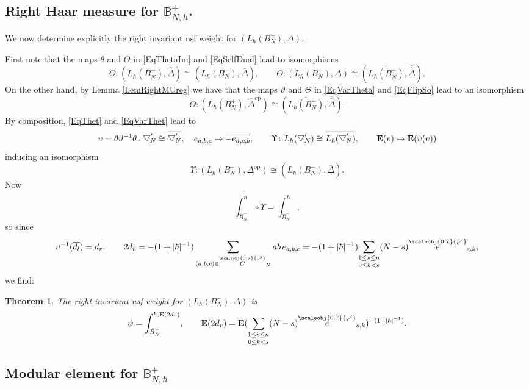 \documentclass[11pt, reqno]{amsart}
\newtheorem{theorem}{Theorem}[section]
\theoremstyle{definition}
\numberwithin{equation}{section}
\newcommand{\eb}{\mathbf{E}}
\newcommand{\Bor}{B}
\newcommand{\nears}{\scaleobj{0.7}{\nearrow}}
\newcommand{\swars}{\scaleobj{0.7}{\swarrow}}
\newcommand{\swe}{\overset{\swars}{e}}
\newcommand{\neC}{\overset{\nears}{C}}
\newcommand{\Eb}{\mathbf{E}}
\newcommand{\wbtd}[1]{\raisebox{\depth}{$\bigtriangledown'$\!\!}_{#1}}
\newcommand{\opp}{\mathrm{op}}
\newcommand{\Bbbb}{\mathbb{B}}
\begin{document}
\subsection{Right Haar measure for  \texorpdfstring{$\Bbbb_{N,\hbar}^+$}{the upper Borel quantum group}.}

We now determine explicitly the right invariant nsf weight for $(L_{\hbar}(\Bor_N^-),\Delta)$. 

First note that the maps 
$\theta$ and $\Theta$ in \eqref{EqThetaIm} and \eqref{EqSelfDual} lead to  isomorphisms 
\begin{equation}\label{EqThet}
\Theta\colon (L_{\hbar}(\Bor_N^+),\hat{\Delta}) \cong (\overline{L_{\hbar}(\Bor_N^-)},\overline{\Delta}),\qquad \Theta\colon  (L_{\hbar}(\Bor_N^-),\Delta)\cong (\overline{L_{\hbar}(\Bor_N^+)},\overline{\hat{\Delta}}).
\end{equation}
On the other hand, by Lemma \ref{LemRightMUreg} we have that the maps $\vartheta$ and $\varTheta$ in \eqref{EqVarTheta} and \eqref{EqFlipSo} lead to an isomorphism 
\begin{equation}\label{EqVarThet}
\varTheta\colon (L_{\hbar}(\Bor_N^+),\hat{\Delta}^{\opp}) \cong (\overline{L_{\hbar}(\Bor_N^+)},\overline{\hat{\Delta}}).
\end{equation}
By composition, \eqref{EqThet} and \eqref{EqVarThet} lead to 
\[
\upsilon= \theta\vartheta^{-1}\theta\colon  \wbtd{N}\cong \overline{\wbtd{N}},\quad e_{a,b,c} \mapsto \overline{-e_{a,c,b}},\qquad 
\Upsilon\colon  L_{\hbar}(\wbtd{N}) \cong \overline{L_{\hbar}(\wbtd{N})},\qquad \eb(v) \mapsto \eb(\upsilon(v))
\]
inducing an isomorphism
\[
\Upsilon\colon  (L_{\hbar}(\Bor_N^-),\Delta^{\opp}) \cong (\overline{L_{\hbar}(\Bor_N^-)},\overline{\Delta}).
\]
Now 
\[
\overline{\int_{\hat{\Bor}_N^-}^{\hbar}} \circ \Upsilon = \int_{\hat{\Bor}_N^-}^{\hbar},
\]
so since 
\[
\upsilon^{-1}(\overline{d_l}) = d_r,\qquad 2d_r = -(1+|\hbar|^{-1})\sum_{(a,b,c)\in \neC_N} ab \,e_{a,b,c} = -(1+|\hbar|^{-1})\underset{0\leq k<s}{\sum_{1\leq s\leq n}} (N-s)\swe_{s,k},
\]
we find:
\begin{theorem}\label{TheoRightNSF}
The right invariant nsf weight for $(L_{\hbar}(\Bor_N^-),\Delta)$ is 
\[
\psi = \int_{\hat{\Bor}_N^-}^{\hbar,\Eb(2d_r)},\qquad \Eb(2d_r) = \Eb(\underset{0\leq k<s}{\sum_{1\leq s\leq n}} (N-s)\swe_{s,k})^{-(1+|\hbar|^{-1})}.
\]
\end{theorem}

\subsection{Modular element for  \texorpdfstring{$\Bbbb_{N,\hbar}^+$}{the upper Borel quantum group}}
\end{document}
